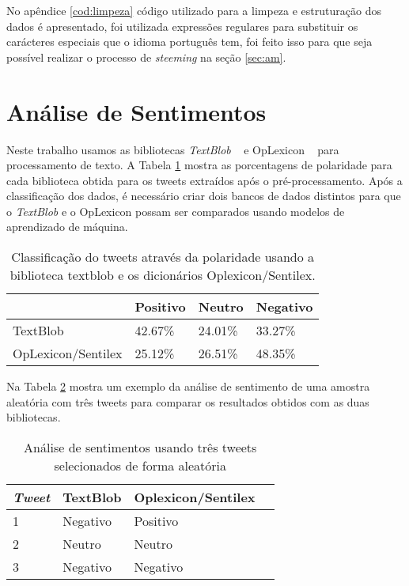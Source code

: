 No apêndice \ref{cod:limpeza} código utilizado para a limpeza e estruturação dos dados é apresentado, 
foi utilizada expressões regulares para substituir os carácteres especiais que o idioma português tem, 
foi feito isso para que seja possível realizar o processo de \textit{steeming} na seção \ref{sec:am}.



\section{Análise de Sentimentos}

Neste trabalho usamos as bibliotecas \textit{TextBlob} ~\cite{textblob}     e OpLexicon
~\cite{souza} para processamento de texto. A Tabela \ref{table1} mostra as
porcentagens de polaridade para cada biblioteca obtida para
os tweets extraídos após o pré-processamento.
Após a classificação dos dados, é necessário criar dois
bancos de dados distintos para que o \textit{TextBlob} e o OpLexicon
possam ser comparados usando modelos de aprendizado de
máquina. 


\begin{table}
    \label{table1}
    \centering
    \caption{Classificação do tweets através da polaridade usando a
    biblioteca textblob e os dicionários Oplexicon/Sentilex.}
   
    \begin{tabular}{llll}
    \hline
              & Positivo & Neutro & Negativo \\ \hline
    TextBlob  & 42.67\%  & 24.01\% & 33.27\%  \\ \hline
    OpLexicon/Sentilex & 25.12\%  & 26.51\% & 48.35\%  \\ \hline
    \end{tabular}
\end{table}




Na Tabela \ref{table2} mostra um exemplo da análise de sentimento
de uma amostra aleatória com três tweets para comparar
os resultados obtidos com as duas bibliotecas.


\begin{table}
    \label{table2}
    \centering
    \caption{Análise de sentimentos usando três tweets selecionados de forma aleatória}
    \begin{tabular}{llll}
    \hline
    \textit{Tweet}          & TextBlob & Oplexicon/Sentilex \\ \hline
    1  & Negativo & Positivo  \\ \hline
    2& Neutro  & Neutro  \\ \hline
    3& Negativo  & Negativo  \\ \hline
    \end{tabular}


\end{table}




